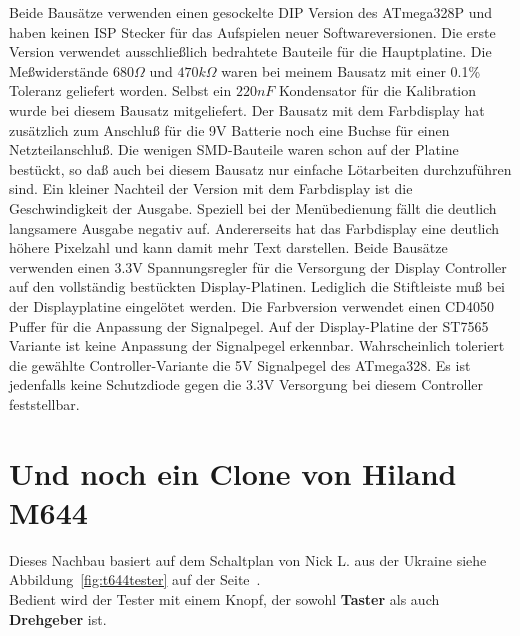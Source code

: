Beide Bausätze verwenden einen gesockelte DIP Version des ATmega328P und haben keinen 
ISP Stecker für das Aufspielen neuer Softwareversionen.
Die erste Version verwendet
ausschließlich bedrahtete Bauteile für die Hauptplatine. Die Meßwiderstände \(680\Omega\) und \(470k\Omega\)
waren bei meinem Bausatz mit einer 0.1\% Toleranz geliefert worden.
Selbst ein \(220 nF\) Kondensator für die Kalibration wurde bei diesem Bausatz mitgeliefert.
Der Bausatz mit dem Farbdisplay hat zusätzlich zum Anschluß für die 9V Batterie noch eine Buchse
für einen Netzteilanschluß. Die wenigen SMD-Bauteile waren schon auf der Platine bestückt,
so daß auch bei diesem Bausatz nur einfache Lötarbeiten durchzuführen sind.
Ein kleiner Nachteil der Version mit dem Farbdisplay ist die Geschwindigkeit der Ausgabe.
Speziell bei der Menübedienung fällt die deutlich langsamere Ausgabe negativ auf.
Andererseits hat das Farbdisplay eine deutlich höhere Pixelzahl und kann damit mehr Text darstellen. 
Beide Bausätze verwenden einen 3.3V Spannungsregler für die Versorgung der Display Controller auf
den vollständig bestückten Display-Platinen. Lediglich die Stiftleiste muß bei
der Displayplatine eingelötet werden.
Die Farbversion verwendet einen CD4050 Puffer für die Anpassung der Signalpegel.
Auf der Display-Platine der ST7565 Variante ist keine Anpassung der Signalpegel erkennbar.
Wahrscheinlich toleriert die gewählte Controller-Variante die 5V Signalpegel des ATmega328.
Es ist jedenfalls keine Schutzdiode gegen die 3.3V Versorgung bei diesem Controller feststellbar.

\section{Und noch ein Clone von Hiland M644}
\label{sec:hiland}
Dieses Nachbau basiert auf dem Schaltplan von Nick L. aus der Ukraine siehe Abbildung~\ref{fig:t644tester}
auf der Seite~\pageref{fig:t644tester}.\\
Bedient wird der Tester mit einem Knopf, der sowohl \textbf {Taster} als auch \textbf {Drehgeber} ist.

